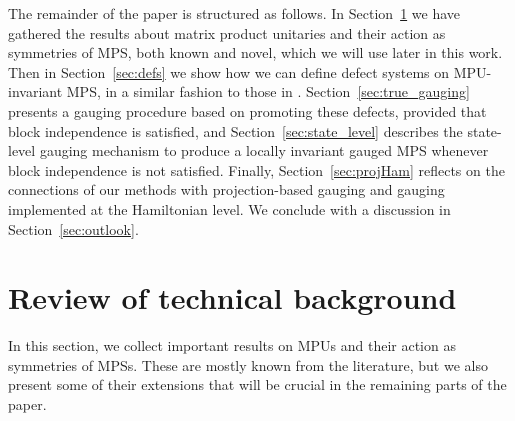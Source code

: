 \documentclass[reprint,
superscriptaddress,
amsmath,amssymb,
notitlepage,
aps,
prb,
10pt, 
tightenlines
]{revtex4-2}
\begin{document}
The remainder of the paper is structured as follows. In Section~\ref{sec:MPUs} we have gathered the results about matrix product unitaries and their action as symmetries of MPS, both known and novel, which we will use later in this work. Then in Section~\ref{sec:defs} we show how we can define defect systems on MPU-invariant MPS, in a similar fashion to those in \cite{Seifnashri}. Section~\ref{sec:true_gauging} presents a gauging procedure based on promoting these defects, provided that block independence is satisfied, and Section~\ref{sec:state_level} describes the state-level gauging mechanism to produce a locally invariant gauged MPS whenever block independence is not satisfied. Finally, Section~\ref{sec:projHam} reflects on the connections of our methods with projection-based gauging and gauging implemented at the Hamiltonian level. We conclude with a discussion in Section~\ref{sec:outlook}.

\section{Review of technical background}
\label{sec:MPUs}
In this section, we collect important results on MPUs and their action as symmetries of MPSs. These are mostly known from the literature, but we also present some of their extensions that will be crucial in the remaining parts of the paper.
\end{document}
